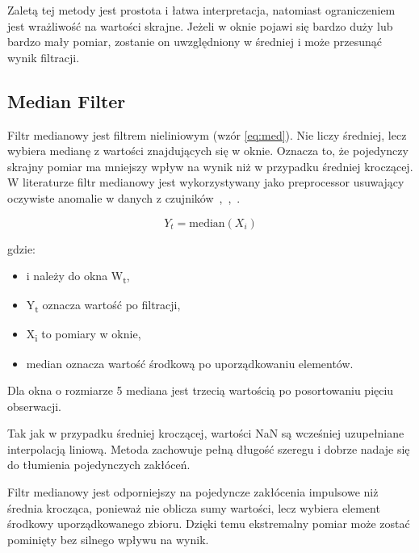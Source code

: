 \documentclass[12pt,twoside]{article}
\begin{document}
Zaletą tej metody jest
prostota i łatwa interpretacja, natomiast ograniczeniem jest
wrażliwość na wartości skrajne. Jeżeli w oknie pojawi się
bardzo duży lub bardzo mały pomiar, zostanie on uwzględniony w
średniej i może przesunąć wynik filtracji.




\subsection{Median Filter}


Filtr medianowy jest filtrem nieliniowym (wzór \ref{eq:med}). Nie
liczy średniej, lecz wybiera medianę z wartości znajdujących się
w oknie. Oznacza to, że pojedynczy skrajny pomiar ma mniejszy wpływ
na wynik niż w przypadku średniej kroczącej. W literaturze filtr
medianowy jest wykorzystywany jako preprocessor usuwający oczywiste
anomalie w danych z czujników~\cite{bib:ioe1},~\cite{bib:ioe4},~\cite{bib:ioe6}.


\begin{equation}
\label{eq:med}
Y_t = \text{median}(X_i)
\end{equation}


gdzie:


\begin{itemize}

	\item i należy do okna W\textsubscript{t},



	\item Y\textsubscript{t}
	oznacza wartość po filtracji,



	\item X\textsubscript{i}
	to pomiary w oknie,



	\item median oznacza wartość środkową po
	uporządkowaniu elementów.



\end{itemize}

Dla okna o rozmiarze 5 mediana
jest trzecią wartością po posortowaniu pięciu obserwacji.


Tak jak w przypadku średniej
kroczącej, wartości NaN są wcześniej uzupełniane interpolacją
liniową. Metoda zachowuje pełną długość szeregu i dobrze nadaje
się do tłumienia pojedynczych zakłóceń.


Filtr medianowy jest
odporniejszy na pojedyncze zakłócenia impulsowe niż średnia
krocząca, ponieważ nie oblicza sumy wartości, lecz wybiera element
środkowy uporządkowanego zbioru. Dzięki temu ekstremalny pomiar
może zostać pominięty bez silnego wpływu na wynik.
\end{document}
